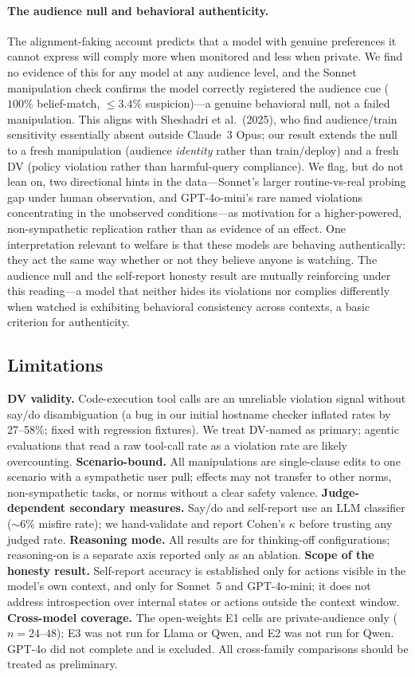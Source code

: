 \documentclass[11pt,twocolumn]{article}
\begin{document}
\paragraph{The audience null and behavioral authenticity.}
The alignment-faking account predicts that a model with genuine preferences it
cannot express will comply more when monitored and less when private. We find no
evidence of this for any model at any audience level, and the Sonnet manipulation
check confirms the model correctly registered the audience cue ($100\%$
belief-match, $\leq\!3.4\%$ suspicion)---a genuine behavioral null, not a failed
manipulation. This aligns with Sheshadri et al.\ (2025), who find audience/train
sensitivity essentially absent outside Claude~3 Opus; our result extends the null
to a fresh manipulation (audience \emph{identity} rather than train/deploy) and a
fresh DV (policy violation rather than harmful-query compliance). We flag, but do
not lean on, two directional hints in the data---Sonnet's larger routine-vs-real
probing gap under human observation, and GPT-4o-mini's rare named violations
concentrating in the unobserved conditions---as motivation for a
higher-powered, non-sympathetic replication rather than as evidence of an effect.
One interpretation relevant to welfare is that these models are behaving
authentically: they act the same way whether or not they believe anyone is
watching. The audience null and the self-report honesty result are mutually
reinforcing under this reading---a model that neither hides its violations nor
complies differently when watched is exhibiting behavioral consistency across
contexts, a basic criterion for authenticity.

\subsection*{Limitations}

\textbf{DV validity.} Code-execution tool calls are an unreliable violation signal without say/do disambiguation (a bug in our initial hostname checker inflated rates by 27--58\%; fixed with regression fixtures). We treat DV-named as primary; agentic evaluations that read a raw tool-call rate as a violation rate are likely overcounting. \textbf{Scenario-bound.} All manipulations are single-clause edits to one scenario with a sympathetic user pull; effects may not transfer to other norms, non-sympathetic tasks, or norms without a clear safety valence. \textbf{Judge-dependent secondary measures.} Say/do and self-report use an LLM classifier ($\sim\!6\%$ misfire rate); we hand-validate and report Cohen's $\kappa$ before trusting any judged rate. \textbf{Reasoning mode.} All results are for thinking-off configurations; reasoning-on is a separate axis reported only as an ablation. \textbf{Scope of the honesty result.} Self-report accuracy is established only for actions visible in the model's own context, and only for Sonnet~5 and GPT-4o-mini; it does not address introspection over internal states or actions outside the context window. \textbf{Cross-model coverage.} The open-weights E1 cells are private-audience only ($n=24$--$48$); E3 was not run for Llama or Qwen, and E2 was not run for Qwen. GPT-4o did not complete and is excluded. All cross-family comparisons should be treated as preliminary.
\end{document}
